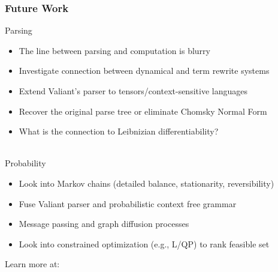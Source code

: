 \documentclass{beamer}
\begin{document}
    \begin{frame}
        \frametitle{Future Work}
        Parsing
        \begin{itemize}
            \item The line between parsing and computation is blurry
            \item Investigate connection between dynamical and term rewrite systems
            \item Extend Valiant's parser to tensors/context-sensitive languages
            \item Recover the original parse tree or eliminate Chomsky Normal Form
            \item What is the connection to Leibnizian differentiability?
        \end{itemize}
        \phantom{space}\\
        Probability
        \begin{itemize}
            \item Look into Markov chains (detailed balance, stationarity, reversibility)
        \item Fuse Valiant parser and probabilistic context free grammar
        \item Message passing and graph diffusion processes
        \item Look into constrained optimization (e.g., L/QP) to rank feasible set
        \end{itemize}
    \end{frame}


    \begin{frame}
        \begin{center}
            \Huge{Learn more at: \\~\\
            \href{http://array22.ndan.co}{\color{blue}{http://array22.ndan.co}}}
        \end{center}
    \end{frame}
\end{document}
